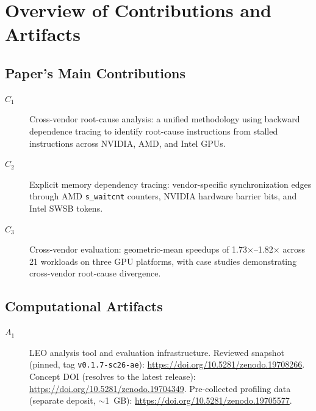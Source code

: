 \documentclass[conference]{IEEEtran}
\begin{document}


\appendixAD

\section{Overview of Contributions and Artifacts}

\subsection{Paper's Main Contributions}

\begin{description}
\item[$C_1$] Cross-vendor root-cause analysis: a unified methodology using backward dependence tracing to identify root-cause instructions from stalled instructions across NVIDIA, AMD, and Intel GPUs.
\item[$C_2$] Explicit memory dependency tracing: vendor-specific synchronization edges through AMD \texttt{s\_waitcnt} counters, NVIDIA hardware barrier bits, and Intel SWSB tokens.
\item[$C_3$] Cross-vendor evaluation: geometric-mean speedups of 1.73$\times$--1.82$\times$ across 21 workloads on three GPU platforms, with case studies demonstrating cross-vendor root-cause divergence.
\end{description}

\subsection{Computational Artifacts}

\begin{description}
\item[$A_1$] LEO analysis tool and evaluation infrastructure. Reviewed snapshot (pinned, tag \texttt{v0.1.7-sc26-ae}): \url{https://doi.org/10.5281/zenodo.19708266}. Concept DOI (resolves to the latest release): \url{https://doi.org/10.5281/zenodo.19704349}. Pre-collected profiling data (separate deposit, $\sim$1~GB): \url{https://doi.org/10.5281/zenodo.19705577}.
\end{description}
\end{document}
